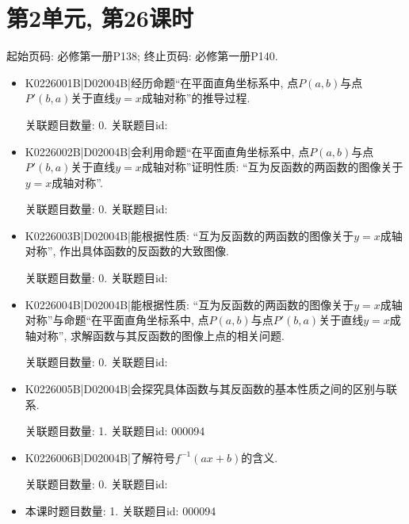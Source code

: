 \section*{第2单元, 第26课时}
起始页码: 必修第一册P138; 终止页码: 必修第一册P140.
\begin{itemize}
\item K0226001B|D02004B|经历命题``在平面直角坐标系中, 点$P(a,b)$与点$P'(b,a)$关于直线$y=x$成轴对称''的推导过程.

关联题目数量: 0. 关联题目id: 

\item K0226002B|D02004B|会利用命题``在平面直角坐标系中, 点$P(a,b)$与点$P'(b,a)$关于直线$y=x$成轴对称''证明性质: ``互为反函数的两函数的图像关于$y=x$成轴对称''.

关联题目数量: 0. 关联题目id: 

\item K0226003B|D02004B|能根据性质: ``互为反函数的两函数的图像关于$y=x$成轴对称'', 作出具体函数的反函数的大致图像.

关联题目数量: 0. 关联题目id: 

\item K0226004B|D02004B|能根据性质: ``互为反函数的两函数的图像关于$y=x$成轴对称''与命题``在平面直角坐标系中, 点$P(a,b)$与点$P'(b,a)$关于直线$y=x$成轴对称'', 求解函数与其反函数的图像上点的相关问题.

关联题目数量: 0. 关联题目id: 

\item K0226005B|D02004B|会探究具体函数与其反函数的基本性质之间的区别与联系.

关联题目数量: 1. 关联题目id: 000094

\item K0226006B|D02004B|了解符号$f^{-1}(ax+b)$的含义.

关联题目数量: 0. 关联题目id: 

\item 本课时题目数量: 1. 关联题目id: 000094

\end{itemize}

